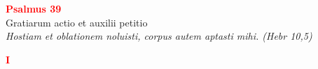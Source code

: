 


\def\greinitialformat#1{%
{\fontsize{39}{39}\selectfont #1}%
}




\vspace{0.3cm}
\begin{center}
 \textcolor{red}{\large \bf Psalmus 39}\\
Gratiarum actio et auxilii petitio\\
\textit{\small Hostiam et oblationem noluisti, corpus autem aptasti mihi. (Hebr 10,5)}
\end{center}
\begin{center}
\textcolor{red}{\bf I}
\end{center}
